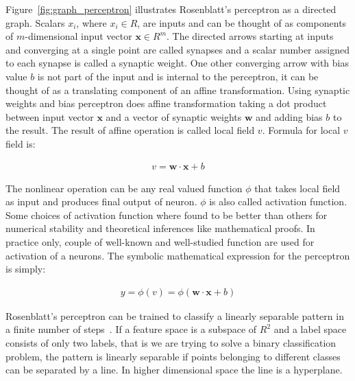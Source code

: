 \documentclass[english, 12pt, a4paper, elec, utf8, online]{aaltothesis}
\begin{document}
Figure~\ref{fig:graph_perceptron} illustrates Rosenblatt's perceptron as a directed graph. Scalars $x_{i}$, where $x_i \in R$, are inputs and can be thought of as components of $m$-dimensional input vector $\mathbf{x} \in R^{m}$. The directed arrows starting at inputs and converging at a single point are called synapses and a scalar number assigned to each synapse is called a synaptic weight. One other converging arrow with bias value $b$ is not part of the input and is internal to the perceptron, it can be thought of as a translating component of an affine transformation. Using synaptic weights and bias perceptron does affine transformation taking a dot product between input vector $\mathbf{x}$ and a vector of synaptic weights $\mathbf{w}$ and adding bias $b$ to the result. The result of affine operation is called local field $v$. Formula for local $v$ field is:

\begin{align*}
v = \mathbf{w} \cdot \mathbf{x} + b 
\end{align*}

The nonlinear operation can be any real valued function $\phi$ that takes local field as input and produces final output of neuron. $\phi$ is also called activation function. Some choices of activation function where found to be better than others for numerical stability and theoretical inferences like mathematical proofs. In practice only, couple of well-known and well-studied function are used for activation of a neurons. The symbolic mathematical expression for the perceptron is simply:

\begin{align}\label{eq:perceptron}
y = \phi(v) = \phi(\mathbf{w} \cdot \mathbf{x} + b) 
\end{align}

Rosenblatt’s perceptron can be trained to classify a linearly separable pattern in a finite number of steps~\cite{haykin2009neural}. If a feature space is a subspace of $R^2$ and a label space consists of only two labels, that is we are trying to solve a binary classification problem, the pattern is linearly separable if points belonging to different classes can be separated by a line. In higher dimensional space the line is a hyperplane. 
\end{document}
